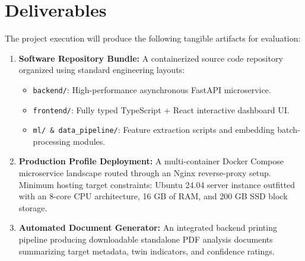 \documentclass[11pt,a4paper]{article}
\begin{document}
\section{Deliverables}
The project execution will produce the following tangible artifacts for evaluation:
\begin{enumerate}
    \item \textbf{Software Repository Bundle:} A containerized source code repository organized using standard engineering layouts:
    \begin{itemize}
        \item \texttt{backend/}: High-performance asynchronous FastAPI microservice.
        \item \texttt{frontend/}: Fully typed TypeScript + React interactive dashboard UI.
        \item \texttt{ml/ \& data\_pipeline/}: Feature extraction scripts and embedding batch-processing modules.
    \end{itemize}
    \item \textbf{Production Profile Deployment:} A multi-container Docker Compose microservice landscape routed through an Nginx reverse-proxy setup. Minimum hosting target constraints: Ubuntu 24.04 server instance outfitted with an 8-core CPU architecture, 16 GB of RAM, and 200 GB SSD block storage.
    \item \textbf{Automated Document Generator:} An integrated backend printing pipeline producing downloadable standalone PDF analysis documents summarizing target metadata, twin indicators, and confidence ratings.
\end{enumerate}
\end{document}
